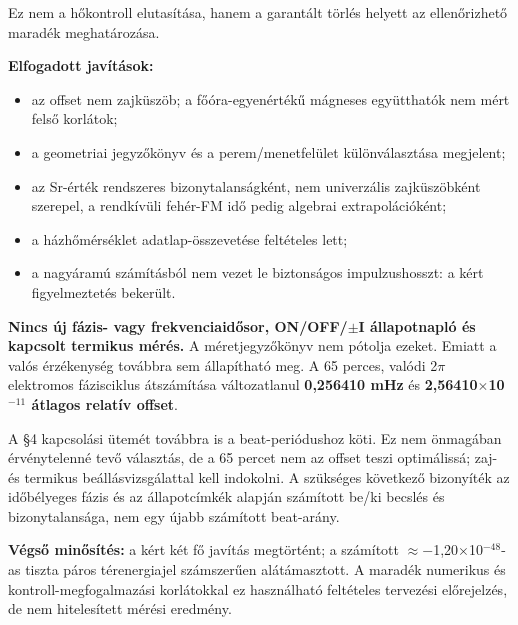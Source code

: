 \documentclass[10pt,a4paper]{article}
\begin{document}
{\begin{quote}
\end{quote}
\par
Ez nem a hőkontroll elutasítása, hanem a garantált törlés helyett az ellenőrizhető maradék meghatározása.
\par
\vspace{2pt}\par\vspace{0.5pt}
\par
\textbf{Elfogadott javítások:}
\par
\begin{itemize}\setlength{\itemsep}{0.5pt}\setlength{\parskip}{0pt}\setlength{\topsep}{1pt}
\item az offset nem zajküszöb; a főóra-egyenértékű mágneses együtthatók nem mért felső korlátok;
\item a geometriai jegyzőkönyv és a perem/menetfelület különválasztása megjelent;
\item az Sr-érték rendszeres bizonytalanságként, nem univerzális zajküszöbként szerepel, a rendkívüli fehér-FM idő pedig algebrai extrapolációként;
\item a házhőmérséklet adatlap-összevetése feltételes lett;
\item a nagyáramú számításból nem vezet le biztonságos impulzushosszt: a kért figyelmeztetés bekerült.
\end{itemize}
\par
\textbf{Nincs új fázis- vagy frekvenciaidősor, ON/OFF/$\pm$I állapotnapló és kapcsolt termikus mérés.} A méretjegyzőkönyv nem pótolja ezeket. Emiatt a valós érzékenység továbbra sem állapítható meg. A 65 perces, valódi 2$\pi$ elektromos fázisciklus átszámítása változatlanul \textbf{0,256410 mHz} és \textbf{2,56410$\times$10$^{-11}$ átlagos relatív offset}.
\par
A \S4 kapcsolási ütemét továbbra is a beat-periódushoz köti. Ez nem önmagában érvénytelenné tevő választás, de a 65 percet nem az offset teszi optimálissá; zaj- és termikus beállásvizsgálattal kell indokolni. A szükséges következő bizonyíték az időbélyeges fázis és az állapotcímkék alapján számított be/ki becslés és bizonytalansága, nem egy újabb számított beat-arány.
\par
\textbf{Végső minősítés:} a kért két fő javítás megtörtént; a számított $\approx$$-$1,20$\times$10$^{-48}$-as tiszta páros térenergiajel számszerűen alátámasztott. A maradék numerikus és kontroll-megfogalmazási korlátokkal ez használható feltételes tervezési előrejelzés, de nem hitelesített mérési eredmény.
$$}
\end{document}
